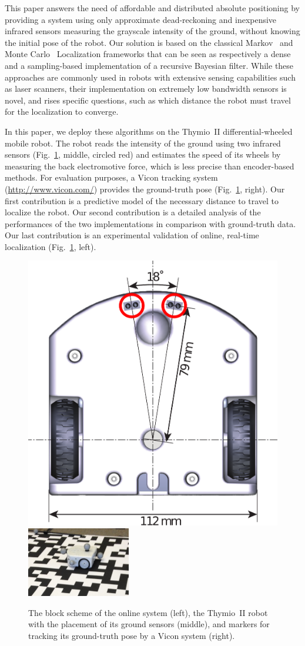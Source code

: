 \documentclass{svmult}
\newcommand{\fig}[1]{Fig.~\ref{fig:#1}}
\begin{document}
This paper answers the need of affordable and distributed absolute positioning by providing a system using only approximate dead-reckoning and inexpensive infrared sensors measuring the grayscale intensity of the ground, without knowing the initial pose of the robot.
Our solution is based on the classical Markov~\cite{fox1999markov} and Monte Carlo~\cite{dellaert1999monte} Localization frameworks that can be seen as respectively a dense and a sampling-based implementation of a recursive Bayesian filter.
While these approaches are commonly used in robots with extensive sensing capabilities such as laser scanners, their implementation on extremely low bandwidth sensors is novel, and rises specific questions, such as which distance the robot must travel for the localization to converge.

In this paper, we deploy these algorithms on the Thymio~II differential-wheeled mobile robot.
The robot reads the intensity of the ground using two infrared sensors (\fig{thymio}, middle, circled red) and estimates the speed of its wheels by measuring the back electromotive force, which is less precise than encoder-based methods.
For evaluation purposes, a Vicon tracking system (\url{http://www.vicon.com/}) provides the ground-truth pose (\fig{thymio}, right).
Our first contribution is a predictive model of the necessary distance to travel to localize the robot.
Our second contribution is a detailed analysis of the performances of the two implementations in comparison with ground-truth data.
Our last contribution is an experimental validation of online, real-time localization (\fig{thymio}, left).

\begin{figure}
\includegraphics[height=.27\columnwidth]{thymio2-dimensions}\hfill
\includegraphics[height=.27\columnwidth]{thymio2-dataset}
\vspace{-.07cm}
\caption{The block scheme of the online system (left), the Thymio~II robot with the placement of its ground sensors (middle), and markers for tracking its ground-truth pose by a Vicon system (right).}
\label{fig:thymio}
\end{figure}
\end{document}
